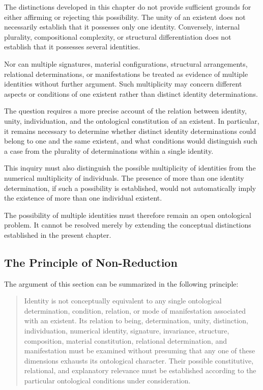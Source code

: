 The distinctions developed in this chapter do not
provide sufficient grounds for either affirming or
rejecting this possibility. The unity of an existent
does not necessarily establish that it possesses only
one identity. Conversely, internal plurality,
compositional complexity, or structural differentiation
does not establish that it possesses several identities.

Nor can multiple signatures, material configurations,
structural arrangements, relational determinations, or
manifestations be treated as evidence of multiple
identities without further argument. Such multiplicity
may concern different aspects or conditions of one
existent rather than distinct identity determinations.

The question requires a more precise account of the
relation between identity, unity, individuation, and
the ontological constitution of an existent. In
particular, it remains necessary to determine whether
distinct identity determinations could belong to one
and the same existent, and what conditions would
distinguish such a case from the plurality of
determinations within a single identity.

This inquiry must also distinguish the possible
multiplicity of identities from the numerical
multiplicity of individuals. The presence of more
than one identity determination, if such a possibility
is established, would not automatically imply the
existence of more than one individual existent.

The possibility of multiple identities must therefore
remain an open ontological problem. It cannot be
resolved merely by extending the conceptual distinctions
established in the present chapter.

\subsection{The Principle of Non-Reduction}

The argument of this section can be summarized in
the following principle:

\begin{quote}
Identity is not conceptually equivalent to any single
ontological determination, condition, relation, or mode
of manifestation associated with an existent. Its
relation to being, determination, unity, distinction,
individuation, numerical identity, signature, invariance,
structure, composition, material constitution, relational
determination, and manifestation must be examined
without presuming that any one of these dimensions
exhausts its ontological character. Their possible
constitutive, relational, and explanatory relevance
must be established according to the particular
ontological conditions under consideration.
\end{quote}

